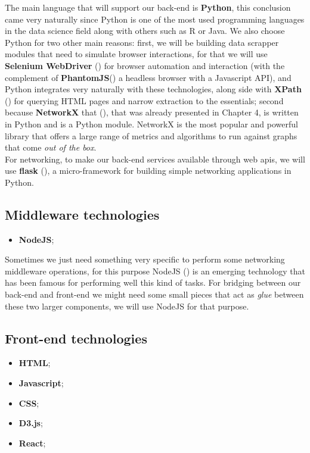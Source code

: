 The main language that will support our back-end is \textbf{Python}, this conclusion came very naturally since Python is one of the most used programming languages in the data science field along with others such as R or Java. We also choose Python for two other main reasons: first, we will be building data scrapper modules that need to simulate browser interactions, for that we will use \textbf{Selenium WebDriver} (\cite{documentation2013selenium}) for browser automation and interaction (with the complement of \textbf{PhantomJS}(\cite{hidayat2013phantomjs}) a headless browser with a Javascript API), and Python integrates very naturally with these technologies, along side with \textbf{XPath} (\cite{clark1999xml}) for querying HTML pages and narrow extraction to the essentials; second because \textbf{NetworkX} that (\cite{hagberg2013networkx}), that was already presented in Chapter 4, is written in Python and is a Python module. NetworkX is the most popular and powerful library that offers a large range of metrics and algorithms to run against graphs that come \textit{out of the box}.\\
\indent For networking, to make our back-end services available through web \glspl{api}, we will use \textbf{flask} (\cite{ronacher2015flask}), a micro-framework for building simple networking applications in Python.

\subsection{Middleware technologies}
\begin{itemize}
    \item \textbf{NodeJS};
\end{itemize}

Sometimes we just need something very specific to perform some networking middleware operations, for this purpose NodeJS (\cite{nodejs}) is an emerging technology
that has been famous for performing well this kind of tasks. For bridging between our back-end and front-end we might need some small pieces that act
as \textit{glue} between these two larger components, we will use NodeJS for that purpose.

\subsection{Front-end technologies}
\begin{itemize}
    \item \textbf{HTML};
    \item \textbf{Javascript};
    \item \textbf{CSS};
    \item \textbf{D3.js};
    \item \textbf{React};
\end{itemize}

